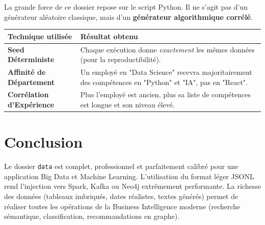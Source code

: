 \documentclass[12pt,a4paper]{article}
\begin{document}
La grande force de ce dossier repose sur le script Python. Il ne s'agit pas d'un générateur aléatoire classique, mais d'un \textbf{générateur algorithmique corrélé}.

\begin{center}
\begin{table}[h!]
    \centering
    \renewcommand{\arraystretch}{1.3}
    \begin{tabularx}{0.8\textwidth}{|X|X|}
    \hline
    \rowcolor{secondary!20}
    \textbf{Technique utilisée} & \textbf{Résultat obtenu} \\
    \hline
    \textbf{Seed Déterministe} & Chaque exécution donne \textit{exactement} les mêmes données (pour la reproductibilité). \\
    \hline
    \textbf{Affinité de Département} & Un employé en "Data Science" recevra majoritairement des compétences en "Python" et "IA", pas en "React". \\
    \hline
    \textbf{Corrélation d'Expérience} & Plus l'employé est ancien, plus sa liste de compétences est longue et son niveau élevé. \\
    \hline
    \end{tabularx}
\end{table}
\end{center}

\section{Conclusion}
Le dossier \texttt{data} est complet, professionnel et parfaitement calibré pour une application Big Data et Machine Learning. L'utilisation du format léger JSONL rend l'injection vers Spark, Kafka ou Neo4j extrêmement performante. La richesse des données (tableaux imbriqués, dates réalistes, textes générés) permet de réaliser toutes les opérations de la Business Intelligence moderne (recherche sémantique, classification, recommandations en graphe).
\end{document}
